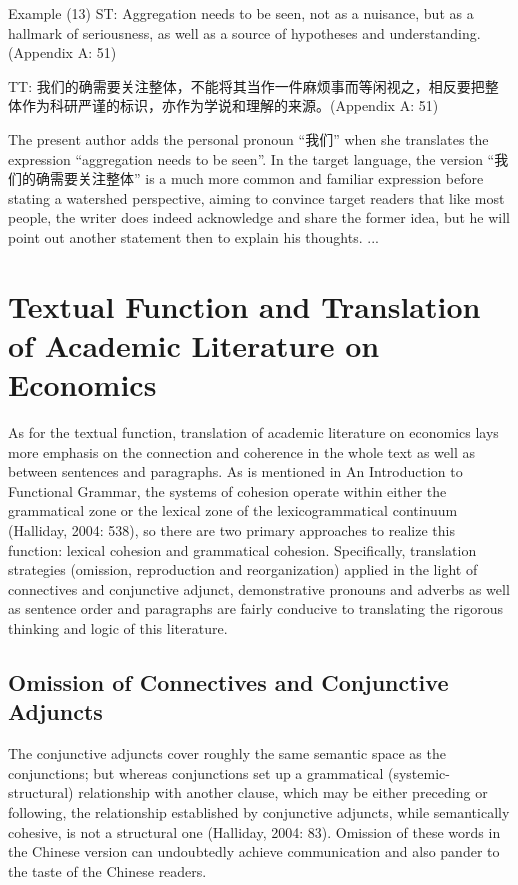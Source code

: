 	Example (13) ST: Aggregation needs to be seen, not as a nuisance, but as a hallmark of seriousness, as well as a source of hypotheses and understanding. (Appendix A: 51) 
	
	TT: 我们的确需要关注整体，不能将其当作一件麻烦事而等闲视之，相反要把整体作为科研严谨的标识，亦作为学说和理解的来源。(Appendix A: 51)
	
	The present author adds the personal pronoun “我们” when she translates the expression “aggregation needs to be seen”. In the target language, the version “我们的确需要关注整体” is a much more common and familiar expression before stating a watershed perspective, aiming to convince target readers that like most people, the writer does indeed acknowledge and share the former idea, but he will point out another statement then to explain his thoughts.
	...
	
\section{Textual Function and Translation of Academic Literature on Economics}
As for the textual function, translation of academic literature on economics lays more emphasis on the connection and coherence in the whole text as well as between sentences and paragraphs. As is mentioned in An Introduction to Functional Grammar, the systems of cohesion operate within either the grammatical zone or the lexical zone of the lexicogrammatical continuum (Halliday, 2004: 538), so there are two primary approaches to realize this function: lexical cohesion and grammatical cohesion. Specifically, translation strategies (omission, reproduction and reorganization) applied in the light of connectives and conjunctive adjunct, demonstrative pronouns and adverbs as well as sentence order and paragraphs are fairly conducive to translating the rigorous thinking and logic of this literature.
	\subsection{Omission of Connectives and Conjunctive Adjuncts}
	The conjunctive adjuncts cover roughly the same semantic space as the conjunctions; but whereas conjunctions set up a grammatical (systemic-structural) relationship with another clause, which may be either preceding or following, the relationship established by conjunctive adjuncts, while semantically cohesive, is not a structural one (Halliday, 2004: 83). Omission of these words in the Chinese version can undoubtedly achieve communication and also pander to the taste of the Chinese readers.
	
